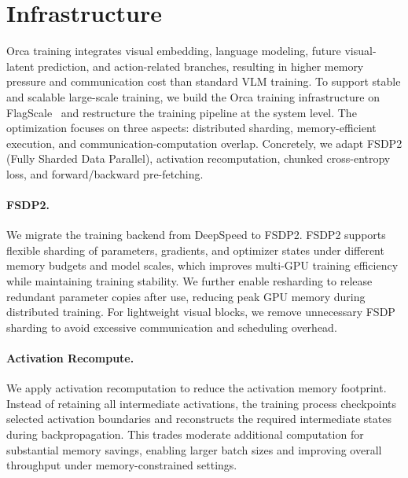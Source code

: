 \section{Infrastructure}\label{sec:appendix_infrastructure}

\renewcommand{\thefigure}{D\arabic{figure}}
\renewcommand{\theHfigure}{D\arabic{figure}}
\setcounter{figure}{0}

\renewcommand{\thetable}{D\arabic{table}}
\renewcommand{\theHtable}{D\arabic{table}}
\setcounter{table}{0}

Orca training integrates visual embedding, language modeling, future visual-latent prediction, and action-related branches, resulting in higher memory pressure and communication cost than standard VLM training. To support stable and scalable large-scale training, we build the Orca training infrastructure on FlagScale~\citep{flagscale} and restructure the training pipeline at the system level. The optimization focuses on three aspects: distributed sharding, memory-efficient execution, and communication-computation overlap. Concretely, we adapt FSDP2 (Fully Sharded Data Parallel), activation recomputation, chunked cross-entropy loss, and forward/backward pre-fetching.



\paragraph{FSDP2.} 
We migrate the training backend from DeepSpeed to FSDP2. FSDP2 supports flexible sharding of parameters, gradients, and optimizer states under different memory budgets and model scales, which improves multi-GPU training efficiency while maintaining training stability. We further enable resharding to release redundant parameter copies after use, reducing peak GPU memory during distributed training. For lightweight visual blocks, we remove unnecessary FSDP sharding to avoid excessive communication and scheduling overhead.


\paragraph{Activation Recompute.} 
We apply activation recomputation to reduce the activation memory footprint. Instead of retaining all intermediate activations, the training process checkpoints selected activation boundaries and reconstructs the required intermediate states during backpropagation. This trades moderate additional computation for substantial memory savings, enabling larger batch sizes and improving overall throughput under memory-constrained settings.


